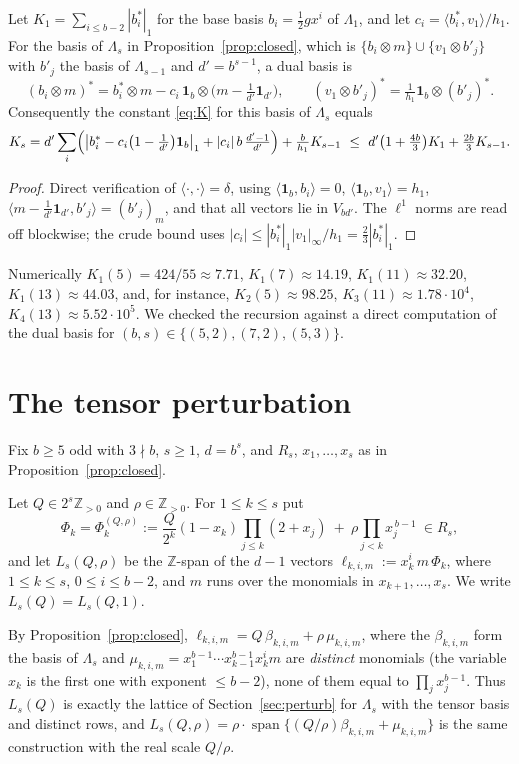 \documentclass[12pt]{article}
\newcommand{\Z}{\mathbb{Z}}
\newcommand{\one}{\mathbf{1}}
\newcommand{\Lat}{\Lambda}
\newcommand{\gpoly}{g}
\begin{document}
\begin{proposition}\label{prop:K}
Let $K_1=\sum_{i\le b-2}|b_i^*|_1$ for the base basis $b_i=\frac12\gpoly x^i$ of $\Lat_1$, and let
$c_i=\langle b_i^*,v_1\rangle/h_1$. For the basis of $\Lat_s$ in Proposition~\ref{prop:closed}, which is
$\{b_i\otimes m\}\cup\{v_1\otimes b'_j\}$ with $b'_j$ the basis of $\Lat_{s-1}$ and $d'=b^{s-1}$, a dual basis is
\[
(b_i\otimes m)^*=b_i^*\otimes m-c_i\,\one_b\otimes\bigl(m-\tfrac1{d'}\one_{d'}\bigr),\qquad
(v_1\otimes b'_j)^*=\tfrac{1}{h_1}\one_b\otimes(b'_j)^*.
\]
Consequently the constant \eqref{eq:K} for this basis of $\Lat_s$ equals
\[
K_s=d'\sum_{i}\Bigl(\bigl|b_i^*-c_i\bigl(1-\tfrac1{d'}\bigr)\one_b\bigr|_1+|c_i|\,b\,\tfrac{d'-1}{d'}\Bigr)+\tfrac{b}{h_1}K_{s-1}
\ \le\ d'\bigl(1+\tfrac{4b}{3}\bigr)K_1+\tfrac{2b}{3}K_{s-1}.
\]
\end{proposition}
\begin{proof}
Direct verification of $\langle\cdot,\cdot\rangle=\delta$, using $\langle\one_b,b_i\rangle=0$,
$\langle\one_b,v_1\rangle=h_1$, $\langle m-\frac1{d'}\one_{d'},b'_j\rangle=(b'_j)_m$, and that all vectors lie in
$V_{bd'}$. The $\ell^1$ norms are read off blockwise; the crude bound uses
$|c_i|\le|b_i^*|_1|v_1|_\infty/h_1=\frac23|b_i^*|_1$.
\end{proof}
Numerically $K_1(5)=424/55\approx7.71$, $K_1(7)\approx14.19$, $K_1(11)\approx32.20$, $K_1(13)\approx44.03$, and,
for instance, $K_2(5)\approx98.25$, $K_3(11)\approx1.78\cdot10^4$, $K_4(13)\approx5.52\cdot10^5$. We checked the
recursion against a direct computation of the dual basis for $(b,s)\in\{(5,2),(7,2),(5,3)\}$.


\section{The tensor perturbation}\label{sec:tensor}

Fix $b\ge5$ odd with $3\nmid b$, $s\ge1$, $d=b^s$, and $R_s$, $x_1,\dots,x_s$ as in Proposition~\ref{prop:closed}.

\begin{definition}\label{def:L}
Let $Q\in2^s\Z_{>0}$ and $\rho\in\Z_{>0}$. For $1\le k\le s$ put
\[
\Phi_k=\Phi_k^{(Q,\rho)}:=\frac{Q}{2^k}(1-x_k)\prod_{j\le k}(2+x_j)\ +\ \rho\prod_{j<k}x_j^{\,b-1}\ \in R_s,
\]
and let $L_s(Q,\rho)$ be the $\Z$-span of the $d-1$ vectors
$\ell_{k,i,m}:=x_k^i\,m\,\Phi_k$, where $1\le k\le s$, $0\le i\le b-2$, and $m$ runs over the monomials in
$x_{k+1},\dots,x_s$. We write $L_s(Q)=L_s(Q,1)$.
\end{definition}
By Proposition~\ref{prop:closed}, $\ell_{k,i,m}=Q\,\beta_{k,i,m}+\rho\,\mu_{k,i,m}$, where the $\beta_{k,i,m}$ form the
basis of $\Lat_s$ and $\mu_{k,i,m}=x_1^{b-1}\cdots x_{k-1}^{b-1}x_k^im$ are \emph{distinct} monomials (the variable
$x_k$ is the first one with exponent $\le b-2$), none of them equal to $\prod_jx_j^{b-1}$. Thus $L_s(Q)$ is exactly the
lattice of Section~\ref{sec:perturb} for $\Lat_s$ with the tensor basis and distinct rows, and
$L_s(Q,\rho)=\rho\cdot\operatorname{span}\{(Q/\rho)\beta_{k,i,m}+\mu_{k,i,m}\}$ is the same construction with the real
scale $Q/\rho$.
\end{document}
